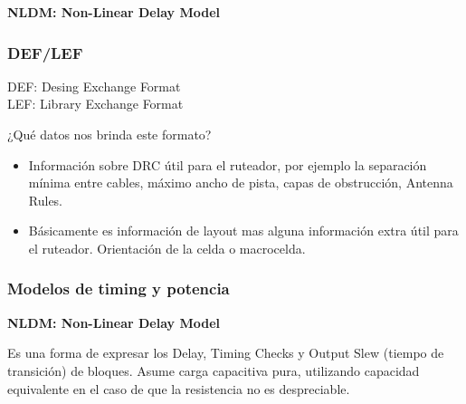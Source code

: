 \documentclass{beamer}
\begin{document}

\begin{frame}
\textbf{NLDM: Non-Linear Delay Model} 
   \begin{figure}[ht]
      \centering
    \end{figure}
\end{frame}


\begin{frame}
\frametitle{DEF/LEF}
DEF: Desing Exchange Format \\
LEF: Library Exchange Format \\

\begin{center}¿Qué datos nos brinda este formato?
\end{center}
    \begin{itemize}
    \item Informaci\'on sobre DRC \'util para el ruteador, por ejemplo la separación mínima entre cables, m\'aximo ancho de pista, capas de obstrucción, Antenna Rules.
    \item B\'asicamente es informaci\'on de layout mas alguna informaci\'on extra \'util para el ruteador. Orientaci\'on de la celda o macrocelda.  
    \end{itemize}
\end{frame}

\begin{frame}
  \frametitle{Modelos de timing y potencia} 

\textbf{NLDM: Non-Linear Delay Model} 

Es una forma de expresar los Delay, Timing Checks y Output Slew (tiempo de transici\'on) de bloques. Asume carga capacitiva pura, utilizando capacidad equivalente en el caso de que la resistencia no es despreciable. 
 
\end{frame}
\end{document}
